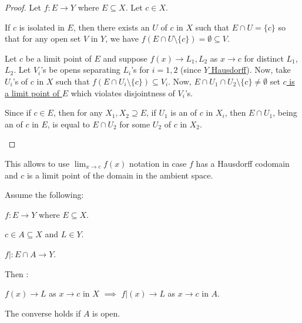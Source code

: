 	\begin{proof}
		Let $f\colon E\to Y$ where $E\subseteq X$. Let $c\in X$.
		\begin{mylist}
			\item If $c$ is isolated in $E$, then there exists an \onbd $U$ of $c$ in $X$ such that $E\cap U = \{c\}$ so that for any open set $V$ in $Y$, we have $f(E\cap U\setminus\{c\}) = \emptyset\subseteq V$.
			
			\item Let $c$ be a limit point of $E$ and suppose $f(x)\to L_1, L_2$ as $x\to c$ for distinct $L_1$, $L_2$. Let $V_i$'s be opens separating $L_i$'s for $i = 1, 2$ (since \uline{$Y$ Hausdorff}). Now, take  $U_i$'s of $c$ in $X$ such that $f(E\cap U_i\setminus\{c\})\subseteq V_i$. Now, $E\cap U_1\cap U_2\setminus\{c\}\ne\emptyset$ set \uline{$c$ is a limit point of $E$} which violates disjointness of $V_i$'s.
			
			\item Since if $c\in E$, then for any $X_1, X_2\supseteq E$, if $U_1$ is an \onbd of $c$ in $X_i$, then $E\cap U_1$, being an \onbd of $c$ in $E$, is equal to $E\cap U_2$ for some \onbd $U_2$ of $c$ in $X_2$.\qedhere
		\end{mylist}
	\end{proof}
	
	\begin{rmk}
		This allows to use $\lim_{x\to c} f(x)$ notation in case $f$ has a Hausdorff codomain and $c$ is a limit point of the domain in the ambient space.
	\end{rmk}
	
	
	\begin{lem}\label{LEM: lims and subspaces}
		Assume the following:
		\begin{assmplist}
			\item $f\colon E\to Y$ where $E\subseteq X$.
			\item $c\in A\subseteq X$ and $L\in Y$.
			\item $f|\colon E\cap A\to Y$.
		\end{assmplist}
		Then \tfh:
		\begin{mylist}
			\item $f(x)\to L$ as $x\to c$ in $X$ $\implies$ $f|(x)\to L$ as $x\to c$ in $A$.
			
			\item\label{LEMii: lims and subspaces} The converse holds if $A$ is open.
		\end{mylist}
	\end{lem}
	
